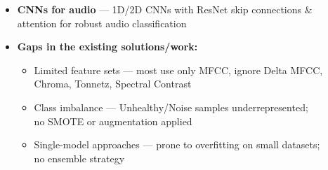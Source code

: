 \documentclass[aspectratio=169]{beamer}
\begin{document}
{\begin{frame}[t]
\begin{itemize}
  \item[\tiny\raise0.5pt\hbox{\rule{4pt}{4pt}}]
    \textbf{CNNs for audio} --- 1D/2D CNNs with ResNet skip connections \&\\
    attention for robust audio classification
\end{itemize}

\vspace{0.25cm}

\begin{itemize}\itemsep0pt
  \item \textbf{Gaps in the existing solutions/work:}
    \begin{itemize}\itemsep1pt
      \item Limited feature sets --- most use only MFCC, ignore Delta MFCC,\\
            Chroma, Tonnetz, Spectral Contrast
      \item Class imbalance --- Unhealthy/Noise samples underrepresented;\\
            no SMOTE or augmentation applied
      \item Single-model approaches --- prone to overfitting on small datasets;\\
            no ensemble strategy
    \end{itemize}
\end{itemize}
\end{frame}
}
\end{document}
